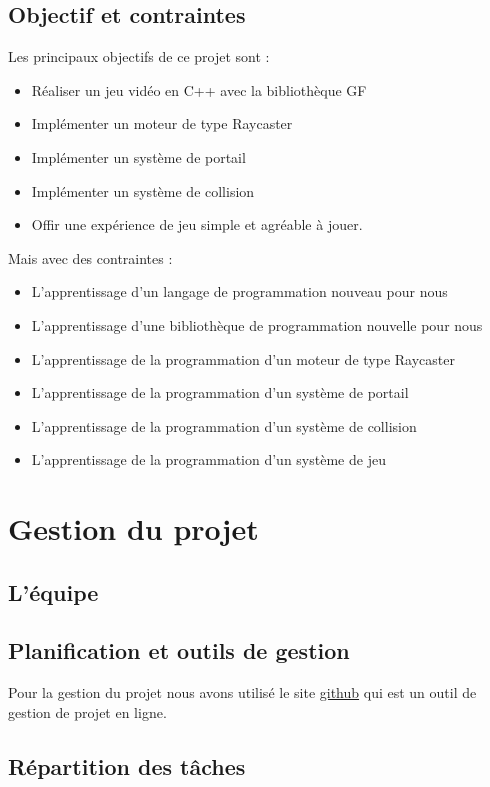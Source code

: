 \documentclass[12pt]{report}
\begin{document}
\subsection{Objectif et contraintes}

Les principaux objectifs de ce projet sont :
\begin{itemize}
	\item Réaliser un jeu vidéo en C++ avec la bibliothèque GF
	\item Implémenter un moteur de type Raycaster
	\item Implémenter un système de portail
	\item Implémenter un système de collision
	\item Offir une expérience de jeu simple et agréable à jouer.
\end{itemize}

Mais avec des contraintes :
\begin{itemize}
	\item L'apprentissage d'un langage de programmation nouveau pour nous
	\item L'apprentissage d'une bibliothèque de programmation nouvelle pour nous
	\item L'apprentissage de la programmation d'un moteur de type Raycaster
	\item L'apprentissage de la programmation d'un système de portail
	\item L'apprentissage de la programmation d'un système de collision
	\item L'apprentissage de la programmation d'un système de jeu
\end{itemize}

\section{Gestion du projet}
\subsection{L'équipe}
\subsection{Planification et outils de gestion}

Pour la gestion du projet nous avons utilisé le site 
\href{https://github.com/}{github} qui est un outil de gestion 
de projet en ligne.

\subsection{Répartition des tâches}
\end{document}
